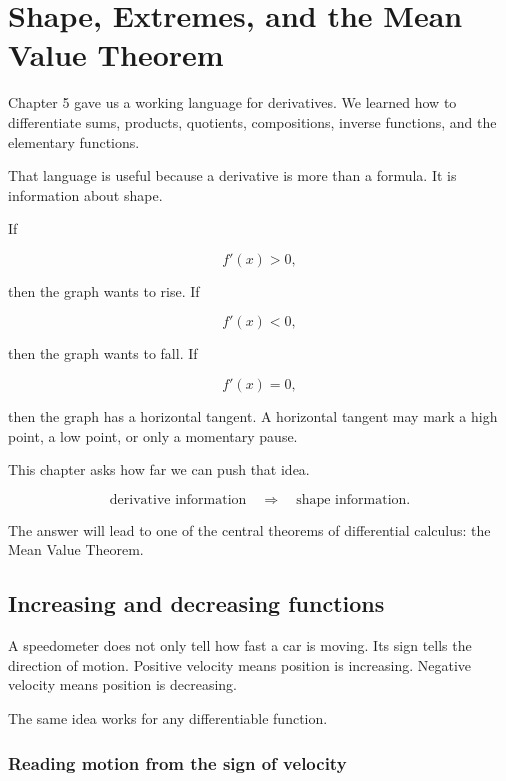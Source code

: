 
\chapter{Shape, Extremes, and the Mean Value Theorem}
\label{chap:shape-extremes-mvt}

Chapter 5 gave us a working language for derivatives.  We learned how to
differentiate sums, products, quotients, compositions, inverse functions, and the
elementary functions.

That language is useful because a derivative is more than a formula.  It is
information about shape.

If

\[
f'(x)>0,
\]

then the graph wants to rise.  If

\[
f'(x)<0,
\]

then the graph wants to fall.  If

\[
f'(x)=0,
\]

then the graph has a horizontal tangent.  A horizontal tangent may mark a high
point, a low point, or only a momentary pause.

This chapter asks how far we can push that idea.

\[
\text{derivative information}
\quad\Longrightarrow\quad
\text{shape information}.
\]

The answer will lead to one of the central theorems of differential calculus: the
Mean Value Theorem.

\section{Increasing and decreasing functions}
\label{sec:increasing-decreasing-functions}

A speedometer does not only tell how fast a car is moving.  Its sign tells the
direction of motion.  Positive velocity means position is increasing.  Negative
velocity means position is decreasing.

The same idea works for any differentiable function.

\subsection{Reading motion from the sign of velocity}
\label{subsec:reading-motion-from-sign-velocity}

